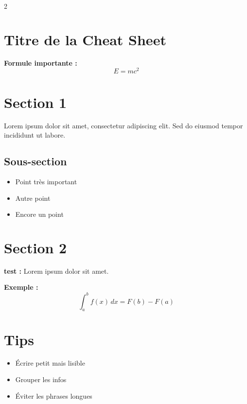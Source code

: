 \documentclass[10pt,a4paper]{article}
\begin{document}
\pagestyle{empty}

\begin{multicols*}{2}


\section*{Titre de la Cheat Sheet}

\textbf{Formule importante :}
\[
E = mc^2
\]

\section*{Section 1}
Lorem ipsum dolor sit amet, consectetur adipiscing elit. Sed do eiusmod tempor incididunt ut labore.

\subsection*{Sous-section}
\begin{itemize}
    \item Point très important
    \item Autre point
    \item Encore un point
\end{itemize}

\section*{Section 2}
\textbf{test :} Lorem ipsum dolor sit amet.

\textbf{Exemple :}
\[
\int_a^b f(x)\,dx = F(b) - F(a)
\]

\section*{Tips}
\begin{itemize}
    \item Écrire petit mais lisible
    \item Grouper les infos
    \item Éviter les phrases longues
\end{itemize}

\end{multicols*}
\end{document}
